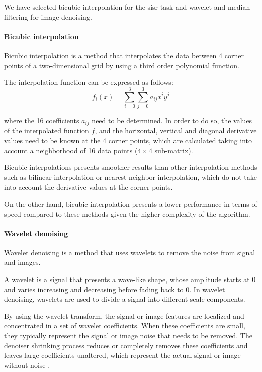 We have selected bicubic interpolation for the \gls{sisr} task and wavelet and median filtering for image denoising.

\paragraph{Bicubic interpolation}
Bicubic interpolation is a method that interpolates the data between 4 corner points of a two-dimensional grid by using a third order polynomial function.

The interpolation function can be expressed as follows:
$$f_i(x) = \sum_{i=0}^{3}\sum_{j=0}^3 a_{ij}x^iy^j$$

where the 16 coefficients $a_{ij}$ need to be determined. In order to do so, the values of the interpolated function $f$, and the horizontal, vertical and diagonal derivative values need to be known at the 4 corner points, which are calculated taking into account a neighborhood of 16 data points ($4\times 4$ sub-matrix).

Bicubic interpolations presents smoother results than other interpolation methods such as bilinear interpolation or nearest neighbor interpolation, which do not take into account the derivative values at the corner points.

On the other hand, bicubic interpolation presents a lower performance in terms of speed compared to these methods given the higher complexity of the algorithm.

\paragraph{Wavelet denoising}
Wavelet denoising is a method that uses wavelets to remove the noise from signal and images.

A wavelet is a signal that presents a wave-like shape, whose amplitude starts at 0 and varies increasing and decreasing before fading back to 0. In wavelet denoising, wavelets are used to divide a signal into different scale components. 

By using the wavelet transform, the signal or image features are localized and concentrated in a set of wavelet coefficients. When these coefficients are small, they typically represent the signal or image noise that needs to be removed. The denoiser shrinking process reduces or completely removes these coefficients and leaves large coefficients unaltered, which represent the actual signal or image without noise \cite{WAVELET}.

